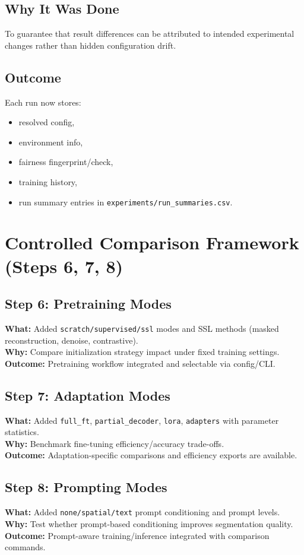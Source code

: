 \documentclass[11pt,a4paper]{article}
\begin{document}
\subsection{Why It Was Done}
To guarantee that result differences can be attributed to intended experimental changes rather than hidden configuration drift.

\subsection{Outcome}
Each run now stores:
\begin{itemize}[leftmargin=1.5em]
  \item resolved config,
  \item environment info,
  \item fairness fingerprint/check,
  \item training history,
  \item run summary entries in \texttt{experiments/run\_summaries.csv}.
\end{itemize}

\section{Controlled Comparison Framework (Steps 6, 7, 8)}
\subsection{Step 6: Pretraining Modes}
\textbf{What:} Added \texttt{scratch/supervised/ssl} modes and SSL methods (masked reconstruction, denoise, contrastive).\\
\textbf{Why:} Compare initialization strategy impact under fixed training settings.\\
\textbf{Outcome:} Pretraining workflow integrated and selectable via config/CLI.

\subsection{Step 7: Adaptation Modes}
\textbf{What:} Added \texttt{full\_ft}, \texttt{partial\_decoder}, \texttt{lora}, \texttt{adapters} with parameter statistics.\\
\textbf{Why:} Benchmark fine-tuning efficiency/accuracy trade-offs.\\
\textbf{Outcome:} Adaptation-specific comparisons and efficiency exports are available.

\subsection{Step 8: Prompting Modes}
\textbf{What:} Added \texttt{none/spatial/text} prompt conditioning and prompt levels.\\
\textbf{Why:} Test whether prompt-based conditioning improves segmentation quality.\\
\textbf{Outcome:} Prompt-aware training/inference integrated with comparison commands.
\end{document}
